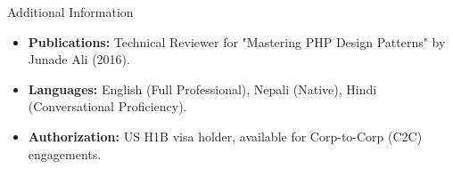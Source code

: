 \documentclass{resume} %
\begin{document}
\begin{rSection}{Additional Information} 
\begin{itemize}
    \itemsep -3pt {}
    \item \textbf{Publications:} Technical Reviewer for "Mastering PHP Design Patterns" by Junade Ali (2016).
    \item \textbf{Languages:} English (Full Professional), Nepali (Native), Hindi (Conversational Proficiency).
    \item \textbf{Authorization:} US H1B visa holder, available for Corp-to-Corp (C2C) engagements.
\end{itemize}
\end{rSection}
\end{document}
